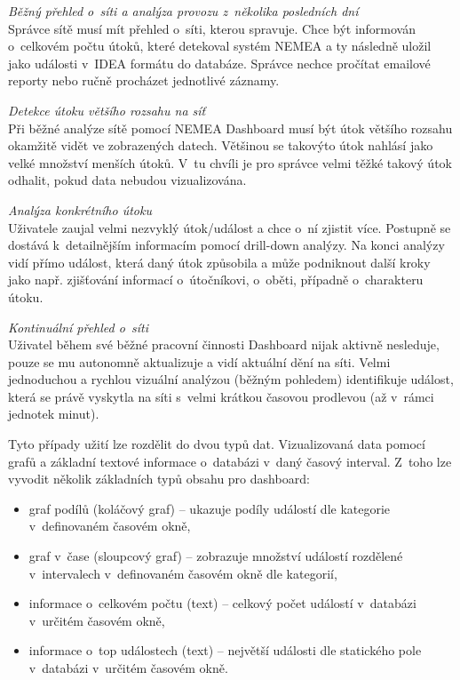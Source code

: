 \begin{description}
    \item \textit{Běžný přehled o~síti a analýza provozu z~několika posledních dní} \\
        Správce sítě musí mít přehled o~síti, kterou spravuje. Chce být informován o~celkovém počtu útoků, které detekoval systém NEMEA a ty následně uložil jako události v~IDEA formátu do databáze. Správce nechce pročítat emailové reporty nebo ručně procházet jednotlivé záznamy.
    \item \textit{Detekce útoku většího rozsahu na síť} \\
        Při běžné analýze sítě pomocí NEMEA Dashboard musí být útok většího rozsahu okamžitě vidět ve zobrazených datech. Většinou se takovýto útok nahlásí jako velké množství menších útoků. V~tu chvíli je pro správce velmi těžké takový útok odhalit, pokud data nebudou vizualizována.
    \item \textit{Analýza konkrétního útoku} \\
        Uživatele zaujal velmi nezvyklý útok/událost a chce o~ní zjistit více. Postupně se dostává k~detailnějším informacím pomocí drill-down analýzy. Na konci analýzy vidí přímo událost, která daný útok způsobila a může podniknout další kroky jako např. zjišťování informací o~útočníkovi, o~oběti, případně o~charakteru útoku.
    \item \textit{Kontinuální přehled o~síti} \\
        Uživatel během své běžné pracovní činnosti Dashboard nijak aktivně nesleduje, pouze se mu autonomně aktualizuje a vidí aktuální dění na síti. Velmi jednoduchou a rychlou vizuální analýzou (běžným pohledem) identifikuje událost, která se právě vyskytla na síti s~velmi krátkou časovou prodlevou (až v~rámci jednotek minut).
        
\end{description}

Tyto případy užití lze rozdělit do dvou typů dat. Vizualizovaná data pomocí grafů a základní textové informace o~databázi v~daný časový interval. Z~toho lze vyvodit několik základních typů obsahu pro dashboard:

\begin{itemize}
    \item graf podílů (koláčový graf) -- ukazuje podíly událostí dle kategorie v~definovaném časovém okně,
    \item graf v~čase (sloupcový graf) -- zobrazuje množství událostí rozdělené v~intervalech v~definovaném časovém okně dle kategorií,
    \item informace o~celkovém počtu (text) -- celkový počet událostí v~databázi v~určitém časovém okně,
    \item informace o~top událostech (text) -- největší události dle statického pole v~databázi v~určitém časovém okně.
\end{itemize}

